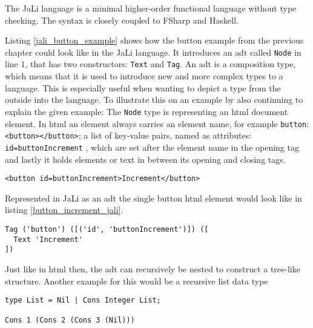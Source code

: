 The JaLi language is a minimal higher-order functional language without type checking. The syntax is closely coupled to FSharp and Haskell.


    
Listing \ref{jali_button_example} shows how the button example from the previous chapter could look like in the JaLi language.
It introduces an \gls{adt} called \texttt{Node} in line 1, that has two constructors: \texttt{Text} and \texttt{Tag}. An \gls{adt} is a composition type, which means that it is used to introduce new and more complex types to a language. This is especially useful when wanting to depict a type from the outside into the language. To illustrate this on an example by also continuing to explain the given example:
The \texttt{Node} type is representing an \gls{html} document element. In \gls{html} an element always carries an element name, for example \texttt{button}: \texttt{<button></button>}; a list of key-value pairs, named as \gls{attributes}: \texttt{id=buttonIncrement} , which are set after the element name in the opening tag and lastly it holds elements or text in between its opening and closing tags.

\begin{lstlisting}[columns=fullflexible, label={button_increment_html}, language=JaLi, caption=Button increment in HTML]
<button id=buttonIncrement>Increment</button>
\end{lstlisting}

Represented in JaLi as an \gls{adt} the single button \gls{html} element would look like in listing \ref{button_increment_jali}.

\begin{lstlisting}[columns=fullflexible, label={button_increment_jali}, language=JaLi, caption=Button increment in JaLi as ADT]
Tag ('button') ([('id', 'buttonIncrement')]) ([
  Text 'Increment'
])
\end{lstlisting}

Just like in \gls{html} then, the \gls{adt} can recursively be nested to construct a tree-like structure.
Another example for this would be a recursive list data type

\begin{lstlisting}[columns=fullflexible, label={recursive_list}, language=JaLi, caption=Recursive list data type]
type List = Nil | Cons Integer List;

Cons 1 (Cons 2 (Cons 3 (Nil)))
\end{lstlisting}

